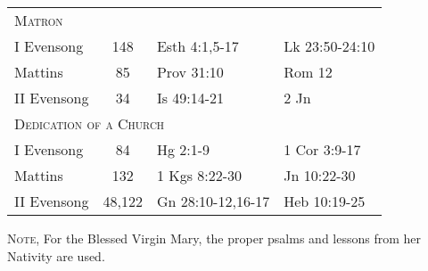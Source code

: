 \begin{longtable}{l c l l}
%
\multicolumn{4}{l}{\textsc{Matron}}\\
\hspace{1em} I Evensong&148&Esth 4:1,5-17&Lk 23:50-24:10\\
\hspace{1em} Mattins&85&Prov 31:10&Rom 12\\
\hspace{1em} II Evensong&34&Is 49:14-21&2 Jn\\
%
\multicolumn{4}{l}{\textsc{Dedication of a Church}}\\
\hspace{1em} I Evensong&84&Hg 2:1-9&1 Cor 3:9-17\\
\hspace{1em} Mattins&132&1 Kgs 8:22-30&Jn 10:22-30\\
\hspace{1em} II Evensong&48,122&Gn 28:10-12,16-17&Heb 10:19-25\\
\end{longtable}
\begin{rubric}
	\textsc{Note,} For the Blessed Virgin Mary, the proper psalms and lessons from her Nativity are used.
\end{rubric}